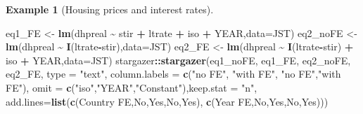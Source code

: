 \documentclass[
  12pt,
]{book}
\newenvironment{Shaded}{\begin{snugshade}}{\end{snugshade}}
\newcommand{\AttributeTok}[1]{\textcolor[rgb]{0.13,0.29,0.53}{#1}}
\newcommand{\FunctionTok}[1]{\textcolor[rgb]{0.13,0.29,0.53}{\textbf{#1}}}
\newcommand{\NormalTok}[1]{#1}
\newcommand{\OtherTok}[1]{\textcolor[rgb]{0.56,0.35,0.01}{#1}}
\newcommand{\SpecialCharTok}[1]{\textcolor[rgb]{0.81,0.36,0.00}{\textbf{#1}}}
\newcommand{\StringTok}[1]{\textcolor[rgb]{0.31,0.60,0.02}{#1}}
\theoremstyle{definition}
\theoremstyle{definition}
\newtheorem{example}{Example}[chapter]
\theoremstyle{definition}
\theoremstyle{definition}
\theoremstyle{remark}
\begin{document}
\begin{example}[Housing prices and interest rates]
\begin{Shaded}
\begin{Highlighting}[]
\NormalTok{eq1\_FE   }\OtherTok{\textless{}{-}} \FunctionTok{lm}\NormalTok{(dhpreal }\SpecialCharTok{\textasciitilde{}}\NormalTok{ stir }\SpecialCharTok{+}\NormalTok{ ltrate }\SpecialCharTok{+}\NormalTok{ iso }\SpecialCharTok{+}\NormalTok{ YEAR,}\AttributeTok{data=}\NormalTok{JST)}
\NormalTok{eq2\_noFE }\OtherTok{\textless{}{-}} \FunctionTok{lm}\NormalTok{(dhpreal }\SpecialCharTok{\textasciitilde{}} \FunctionTok{I}\NormalTok{(ltrate}\SpecialCharTok{{-}}\NormalTok{stir),}\AttributeTok{data=}\NormalTok{JST)}
\NormalTok{eq2\_FE }\OtherTok{\textless{}{-}} \FunctionTok{lm}\NormalTok{(dhpreal }\SpecialCharTok{\textasciitilde{}} \FunctionTok{I}\NormalTok{(ltrate}\SpecialCharTok{{-}}\NormalTok{stir) }\SpecialCharTok{+}\NormalTok{ iso }\SpecialCharTok{+}\NormalTok{ YEAR,}\AttributeTok{data=}\NormalTok{JST)}
\NormalTok{stargazer}\SpecialCharTok{::}\FunctionTok{stargazer}\NormalTok{(eq1\_noFE, eq1\_FE, eq2\_noFE, eq2\_FE, }\AttributeTok{type =} \StringTok{"text"}\NormalTok{,}
                     \AttributeTok{column.labels =} \FunctionTok{c}\NormalTok{(}\StringTok{"no FE"}\NormalTok{, }\StringTok{"with FE"}\NormalTok{, }\StringTok{"no FE"}\NormalTok{,}\StringTok{"with FE"}\NormalTok{),}
                     \AttributeTok{omit =} \FunctionTok{c}\NormalTok{(}\StringTok{"iso"}\NormalTok{,}\StringTok{"YEAR"}\NormalTok{,}\StringTok{"Constant"}\NormalTok{),}\AttributeTok{keep.stat =} \StringTok{"n"}\NormalTok{,}
                     \AttributeTok{add.lines=}\FunctionTok{list}\NormalTok{(}\FunctionTok{c}\NormalTok{(}\StringTok{\textquotesingle{}Country FE\textquotesingle{}}\NormalTok{,}\StringTok{\textquotesingle{}No\textquotesingle{}}\NormalTok{,}\StringTok{\textquotesingle{}Yes\textquotesingle{}}\NormalTok{,}\StringTok{\textquotesingle{}No\textquotesingle{}}\NormalTok{,}\StringTok{\textquotesingle{}Yes\textquotesingle{}}\NormalTok{),}
                                    \FunctionTok{c}\NormalTok{(}\StringTok{\textquotesingle{}Year FE\textquotesingle{}}\NormalTok{,}\StringTok{\textquotesingle{}No\textquotesingle{}}\NormalTok{,}\StringTok{\textquotesingle{}Yes\textquotesingle{}}\NormalTok{,}\StringTok{\textquotesingle{}No\textquotesingle{}}\NormalTok{,}\StringTok{\textquotesingle{}Yes\textquotesingle{}}\NormalTok{)))}
\end{Highlighting}
\end{Shaded}


\end{example}
\end{document}

